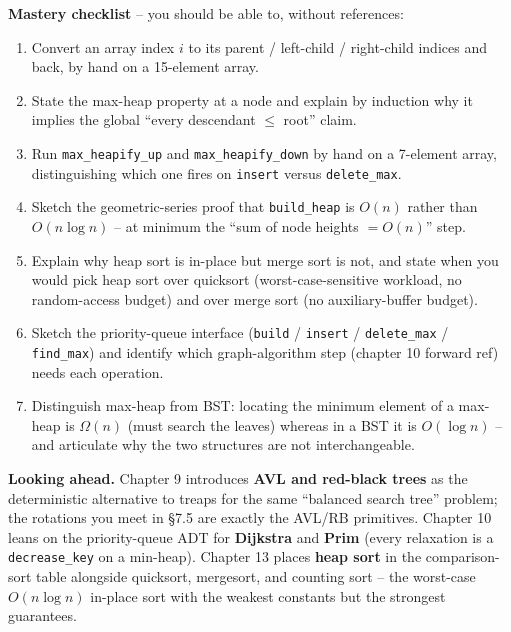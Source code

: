 \documentclass[11pt]{article}
\begin{document}
\begin{ideabox}
\textbf{Mastery checklist} -- you should be able to, without references:
\begin{enumerate}
    \item Convert an array index $i$ to its parent / left-child /
          right-child indices and back, by hand on a 15-element array.
    \item State the max-heap property at a node and explain by
          induction why it implies the global ``every descendant
          $\le$ root'' claim.
    \item Run \texttt{max\_heapify\_up} and \texttt{max\_heapify\_down}
          by hand on a 7-element array, distinguishing which one fires
          on \texttt{insert} versus \texttt{delete\_max}.
    \item Sketch the geometric-series proof that \texttt{build\_heap}
          is $O(n)$ rather than $O(n \log n)$ -- at minimum the
          ``sum of node heights $= O(n)$'' step.
    \item Explain why heap sort is in-place but merge sort is not,
          and state when you would pick heap sort over quicksort
          (worst-case-sensitive workload, no random-access budget) and
          over merge sort (no auxiliary-buffer budget).
    \item Sketch the priority-queue interface (\texttt{build} /
          \texttt{insert} / \texttt{delete\_max} / \texttt{find\_max})
          and identify which graph-algorithm step (chapter 10 forward
          ref) needs each operation.
    \item Distinguish max-heap from BST: locating the minimum element
          of a max-heap is $\Omega(n)$ (must search the leaves)
          whereas in a BST it is $O(\log n)$ -- and articulate why
          the two structures are not interchangeable.
\end{enumerate}

\textbf{Looking ahead.} Chapter 9 introduces \textbf{AVL and red-black
trees} as the deterministic alternative to treaps for the same
``balanced search tree'' problem; the rotations you meet in \S7.5 are
exactly the AVL/RB primitives. Chapter 10 leans on the priority-queue
ADT for \textbf{Dijkstra} and \textbf{Prim} (every relaxation is a
\texttt{decrease\_key} on a min-heap). Chapter 13 places \textbf{heap
sort} in the comparison-sort table alongside quicksort, mergesort, and
counting sort -- the worst-case $O(n \log n)$ in-place sort with the
weakest constants but the strongest guarantees.
\end{ideabox}
\end{document}
